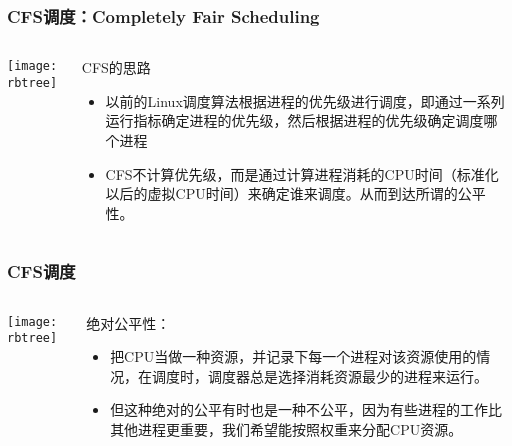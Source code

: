 \begin{frame}
	\frametitle{CFS调度：Completely Fair Scheduling}
	\begin{columns}
	\begin{column}{.4\textwidth}
	\Large \centering
	
    \texttt{[image: rbtree]}
	
	\end{column}
	
	\begin{column}{.6\textwidth}
CFS的思路
\begin{itemize}
	\item 以前的Linux调度算法根据进程的优先级进行调度，即通过一系列运行指标确定进程的优先级，然后根据进程的优先级确定调度哪个进程
	\item CFS不计算优先级，而是通过计算进程消耗的CPU时间（标准化以后的虚拟CPU时间）来确定谁来调度。从而到达所谓的公平性。

	\end{itemize}

	\end{column}
\end{columns}
\end{frame}


\begin{frame}
	\frametitle{CFS调度}
	\begin{columns}
		\begin{column}{.4\textwidth}
			\Large \centering
			
			\texttt{[image: rbtree]}
			
		\end{column}
		
		\begin{column}{.6\textwidth}
			绝对公平性：
			\begin{itemize}
				\item 把CPU当做一种资源，并记录下每一个进程对该资源使用的情况，在调度时，调度器总是选择消耗资源最少的进程来运行。
				\item 但这种绝对的公平有时也是一种不公平，因为有些进程的工作比其他进程更重要，我们希望能按照权重来分配CPU资源。
				
			\end{itemize}
			
		\end{column}
	\end{columns}
\end{frame}


